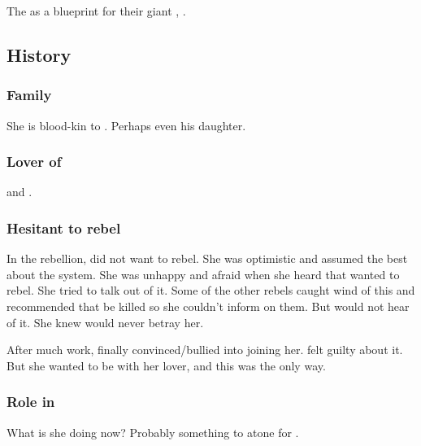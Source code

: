 The  as a blueprint for their giant \carcer, \iquin. 









\subsection{History}





\subsubsection{Family}
She is blood-kin to . 
Perhaps even his daughter. 





\subsubsection{Lover of \Shiaraid}
\Shiaraid{} and \Aryal{} . 





\subsubsection{Hesitant to rebel}
In the \Merkyran{} rebellion, \Eryal{} did not want to rebel.
She was optimistic and assumed the best about the \Merkyran{} system. 
She was unhappy and afraid when she heard that \Shiaraid{} wanted to rebel. 
She tried to talk \Shiaraid{} out of it. 
Some of the other rebels caught wind of this and recommended that \Eryal{} be killed so she couldn't inform on them. 
But \Shiaraid{} would not hear of it. 
She knew \Eryal{} would never betray her. 

After much work, \Shiaraid{} finally convinced/bullied \Eryal{} into joining her. 
\Eryal{} felt guilty about it. 
But she wanted to be with her lover, and this was the only way. 





\subsubsection{Role in \SentinelsofMiithEmph}
What is she doing now? 
Probably something to atone for .

